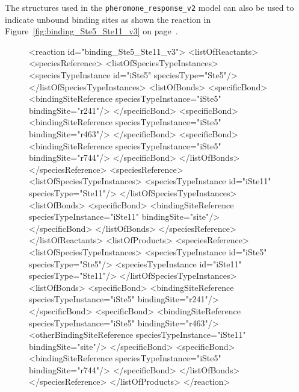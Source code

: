 \documentclass{cekarticle}
\begin{document}
The  structures used in the \texttt{pheromone\_response\_v2} model can also be
used to indicate unbound binding sites as shown the reaction in Figure~\ref{fig:binding_Ste5_Ste11_v3} on
page~\pageref{fig:binding_Ste5_Ste11_v3}.

\begin{figure}[h]
\begin{example}
<reaction id="binding_Ste5_Ste11_v3">
    <listOfReactants>
        <speciesReference>
            <listOfSpeciesTypeInstances>
                <speciesTypeInstance id="iSte5" speciesType="Ste5"/>
            </listOfSpeciesTypeInstances>
            <listOfBonds>
                <specificBond>
                    <bindingSiteReference speciesTypeInstance="iSte5" bindingSite="r241"/>
                </specificBond>
                <specificBond>
                    <bindingSiteReference speciesTypeInstance="iSte5" bindingSite="r463"/>
                </specificBond>
                <specificBond>
                    <bindingSiteReference speciesTypeInstance="iSte5" bindingSite="r744"/>
                </specificBond>
            </listOfBonds>
        </speciesReference>
        <speciesReference>
            <listOfSpeciesTypeInstances>
                <speciesTypeInstance id="iSte11" speciesType="Ste11"/>
            </listOfSpeciesTypeInstances>
            <listOfBonds>
                <specificBond>
                    <bindingSiteReference speciesTypeInstance="iSte11" bindingSite="site"/>
                </specificBond>
            </listOfBonds>
         </speciesReference>
    </listOfReactants>
    <listOfProducts>
        <speciesReference>
            <listOfSpeciesTypeInstances>
                <speciesTypeInstance id="iSte5" speciesType="Ste5"/>
                <speciesTypeInstance id="iSte11" speciesType="Ste11"/>
            </listOfSpeciesTypeInstances>
            <listOfBonds>
                <specificBond>
                    <bindingSiteReference speciesTypeInstance="iSte5" bindingSite="r241"/>
                </specificBond>
                <specificBond>
                    <bindingSiteReference speciesTypeInstance="iSte5" bindingSite="r463"/>
                    <otherBindingSiteReference
                        speciesTypeInstance="iSte11" bindingSite="site"/>
                </specificBond>
                <specificBond>
                    <bindingSiteReference speciesTypeInstance="iSte5" bindingSite="r744"/>
                </specificBond>
            </listOfBonds>
        </speciesReference>
    </listOfProducts>
</reaction>
\end{example}

\end{figure}
\end{document}

